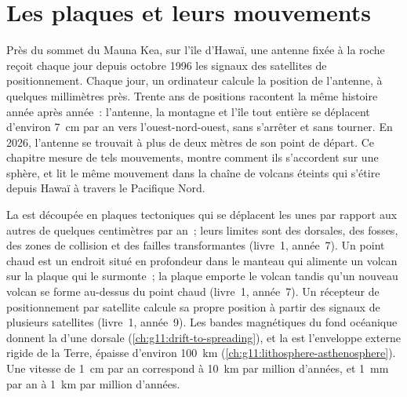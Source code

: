 \chapter{Les plaques et leurs mouvements}\label{ch:g11:plate-motions}

Près du sommet du Mauna Kea, sur l'île d'Hawaï, une antenne fixée à la
roche reçoit chaque jour depuis octobre 1996 les signaux des satellites de
positionnement. Chaque jour, un ordinateur calcule la position de l'antenne,
à quelques millimètres près. Trente ans de positions racontent la même
histoire année après année~: l'antenne, la montagne et l'île tout entière se
déplacent d'environ \qty{7}{cm} par an vers l'ouest-nord-ouest, sans
s'arrêter et sans tourner. En 2026, l'antenne se trouvait à plus de deux
mètres de son point de départ. Ce chapitre mesure de tels mouvements, montre
comment ils s'accordent sur une sphère, et lit le même mouvement dans la
chaîne de volcans éteints qui s'étire depuis Hawaï à travers le Pacifique
Nord.

\begin{recall}
La  est découpée en plaques tectoniques qui se déplacent les unes
par rapport aux autres de quelques centimètres par an~; leurs limites sont
des dorsales, des fosses, des zones de collision et des failles
transformantes (livre~1, année~7). Un point chaud est un endroit situé en
profondeur dans le manteau qui alimente un volcan sur la plaque qui le
surmonte~; la plaque emporte le volcan tandis qu'un nouveau volcan se forme
au-dessus du point chaud (livre~1, année~7). Un récepteur de positionnement
par satellite calcule sa propre position à partir des signaux de plusieurs
satellites (livre~1, année~9). Les bandes magnétiques du fond océanique
donnent la  d'une dorsale
(\cref{ch:g11:drift-to-spreading}), et la  est l'enveloppe
externe rigide de la Terre, épaisse d'environ \qty{100}{km}
(\cref{ch:g11:lithosphere-asthenosphere}). Une vitesse de \qty{1}{cm} par an
correspond à \qty{10}{km} par million d'années, et \qty{1}{mm} par an à
\qty{1}{km} par million d'années.
\end{recall}

